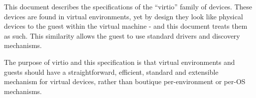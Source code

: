 This document describes the specifications of the ``virtio'' family of
devices. These devices are found in virtual environments, yet by
design they look like physical devices to the guest
within the virtual machine - and this
document treats them as such. This similarity allows the guest to use standard
drivers and discovery mechanisms.

The purpose of virtio and this specification is that virtual
environments and guests should have a straightforward, efficient,
standard and extensible mechanism for virtual devices, rather
than boutique per-environment or per-OS mechanisms.
